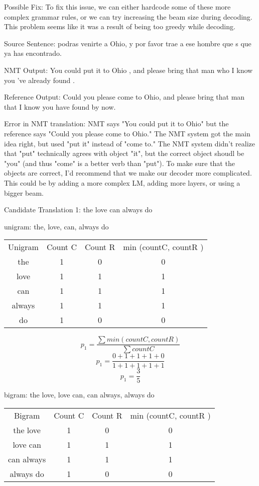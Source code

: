 \documentclass[11pt,largemargins]{homework}
\begin{document}
Possible Fix: To fix this issue, we can either hardcode some of these more complex grammar rules, or we can try increasing the beam size during decoding. This problem seems like it was a result of being too greedy while decoding. 


Source Sentence: podras venirte a Ohio, y por favor trae a ese hombre que s que ya has encontrado.

NMT Output:  You could put it to Ohio , and please bring that man who I know you 've already found .

Reference Output: Could you please come to Ohio,  and please bring that man  that I know you have found by now.

Error in NMT translation: NMT says "You could put it to Ohio" but the reference says "Could you please come to Ohio." The NMT system got the main idea right, but used "put it" instead of "come to." The NMT system didn't realize that "put" technically agrees with object "it", but the correct object shoudl be "you" (and thus "come" is a better verb than "put"). To make sure that the objects are correct, I'd recommend that we make our decoder more complicated. This could be by adding a more complex LM, adding more layers, or using a bigger beam.  


\question

Candidate Translation 1: the love can always do


unigram: the, love, can, always do

\begin{center}
\begin{tabular}{ |c|c|c|c| }
 \hline
   Unigram & Count C & Count R & min (countC, countR ) \\
   the & 1 & 0 & 0 \\
   love & 1 & 1 & 1 \\ 
   can & 1 & 1 & 1 \\
   always & 1 & 1 & 1 \\
   do & 1 & 0 & 0 \\
 \hline
\end{tabular}
\end{center}

$$ p_1 = \frac{\sum min (countC, countR)}{ \sum countC } $$
$$ p_1 = \frac{0 + 1 + 1 + 1 + 0}{ 1 + 1 + 1 + 1 + 1 } $$
$$ p_1 = \frac{3}{5} $$

bigram: the love, love can, can always, always do

\begin{center}
\begin{tabular}{ |c|c|c|c| }
 \hline
   Bigram & Count C & Count R & min (countC, countR ) \\
   the love & 1 & 0 & 0 \\
   love can & 1 & 1 & 1 \\ 
   can always & 1 & 1 & 1 \\
   always do & 1 & 0 & 0 \\
 \hline
\end{tabular}
\end{center}
\end{document}
